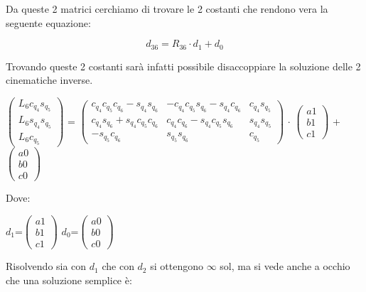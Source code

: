 \documentclass[a4paper,12pt]{article}
\begin{document}
Da queste 2 matrici cerchiamo di trovare le 2 costanti che rendono vera la seguente equazione:

$$ d_{36} = R_{36} \cdot d_1 + d_0 $$

Trovando queste 2 costanti sarà infatti possibile disaccoppiare la soluzione delle 2 cinematiche inverse.





\begin{center}
$\begin{pmatrix}{L_6} {c_{{q_4}}} {s_{{q_5}}}\\
{L_6} {s_{{q_4}}} {s_{{q_5}}}\\
{L_6} {c_{{q_5}}}\end{pmatrix}$
=
$\begin{pmatrix}{c_{{q_4}}} {c_{{q_5}}} {c_{{q_6}}}-{s_{{q_4}}} {s_{{q_6}}} & -{c_{{q_4}}} {c_{{q_5}}} {s_{{q_6}}}-{s_{{q_4}}} {c_{{q_6}}} & {c_{{q_4}}} {s_{{q_5}}}\\
{c_{{q_4}}} {s_{{q_6}}}+{s_{{q_4}}} {c_{{q_5}}} {c_{{q_6}}} & {c_{{q_4}}} {c_{{q_6}}}-{s_{{q_4}}} {c_{{q_5}}} {s_{{q_6}}} & {s_{{q_4}}} {s_{{q_5}}}\\
-{s_{{q_5}}} {c_{{q_6}}} & {s_{{q_5}}} {s_{{q_6}}} & {c_{{q_5}}}\end{pmatrix}$
$\cdot$
$\begin{pmatrix}\mathit{a1}\\
\mathit{b1}\\
\mathit{c1}\end{pmatrix}$
+
$\begin{pmatrix}\mathit{a0}\\
\mathit{b0}\\
\mathit{c0}\end{pmatrix}$
\end{center}

Dove:
\begin{center}
$ d_1 $=$\begin{pmatrix}\mathit{a1}\\
\mathit{b1}\\
\mathit{c1}\end{pmatrix}$
\space
$ d_0 $=$\begin{pmatrix}\mathit{a0}\\
\mathit{b0}\\
\mathit{c0}\end{pmatrix}$
\end{center}


Risolvendo sia con $d_1$ che con $d_2$ si ottengono $\infty$ sol, ma si vede anche a occhio che una soluzione semplice è:
\end{document}
